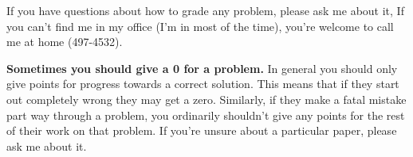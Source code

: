 \documentclass[12pt]{article}
\begin{document}
If you have questions about how to grade any problem, please ask me about it, 
If you can't find me in my office (I'm in most of the time), you're welcome to
call me at home (497-4532).

{\bf Sometimes you should give a 0 for a problem.}  In general you should only
give points for progress towards a correct solution.  This means that if they
start out completely wrong they may get a zero.  Similarly, if they make a
fatal mistake part way through a problem, you ordinarily shouldn't give any
points for the rest of their work on that problem.  If you're unsure about a
particular paper, please ask me about it.
\end{document}
